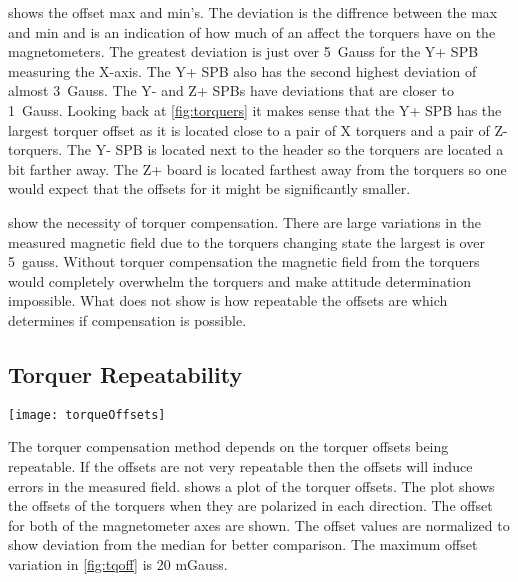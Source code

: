  shows the offset max and min's. The deviation is the diffrence between the max and min and is an indication of how much of an affect the torquers have on the magnetometers. The greatest deviation is just over 5~Gauss for the Y+ \ac{SPB} measuring the X-axis. The Y+ \ac{SPB} also has the second highest deviation of almost 3~Gauss. The Y- and Z+ \acp{SPB} have deviations that are closer to 1~Gauss. Looking back at \cref{fig:torquers} it makes sense that the Y+ \ac{SPB} has the largest torquer offset as it is located close to a pair of X torquers and a pair of Z-torquers. The Y- \ac{SPB} is located next to the header so the torquers are located a bit farther away. The Z+ board is located farthest away from the torquers so one would expect that the offsets for it might be significantly smaller.


 show the necessity of torquer compensation. There are large variations in the measured magnetic field due to the torquers changing state the largest is over 5~gauss. Without torquer compensation the magnetic field from the torquers would completely overwhelm the torquers and make attitude determination impossible. What  does not show is how repeatable the offsets are which determines if compensation is possible.

\subsection{Torquer Repeatability}

\begin{sidewaysfigure}
    \centering
    \texttt{[image: torqueOffsets]}
    \caption{Box Plot from torquer offset test}
    \label{fig:tqoff}
\end{sidewaysfigure}

The torquer compensation method depends on the torquer offsets being repeatable. If the offsets are not very repeatable then the offsets will induce errors in the measured field.  shows a plot of the torquer offsets. The plot shows the offsets of the torquers when they are polarized in each direction. The offset for both of the magnetometer axes are shown. The offset values are normalized to show deviation from the median for better comparison. The maximum offset variation in \cref{fig:tqoff} is 20 mGauss.



